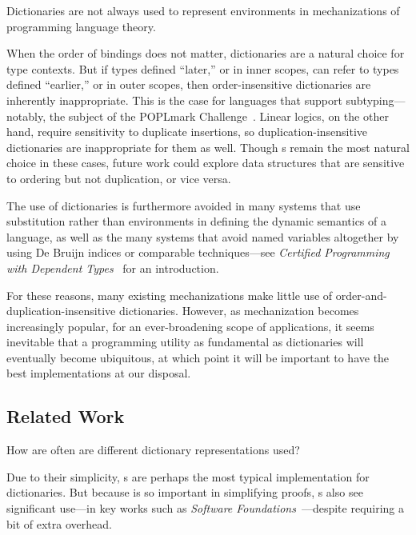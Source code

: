 
Dictionaries are not always used to represent environments in mechanizations of programming language theory.

When the order of bindings does not matter, dictionaries are a natural choice for type contexts.
%
But if types defined ``later,'' or in inner scopes, can refer to types defined ``earlier,'' or in outer scopes, then order-insensitive dictionaries are inherently inappropriate.
%
This is the case for languages that support subtyping---notably, the subject of the POPLmark Challenge~\citep{POPLmark}.
%
Linear logics, on the other hand, require sensitivity to duplicate insertions, so duplication-insensitive dictionaries are inappropriate for them as well.
%
Though {\sal}s remain the most natural choice in these cases, future work could explore data structures that are sensitive to ordering but not duplication, or vice versa.

The use of dictionaries is furthermore avoided in many systems that use substitution rather than environments
%
in defining the dynamic semantics of a language, as well as the many systems that avoid named variables altogether by using De Bruijn indices or comparable techniques---see \emph{Certified Programming with Dependent Types}~\cite[Library Firstorder]{cpdt} for an introduction.

For these reasons, many existing mechanizations make little use of order-and-duplication-insensitive dictionaries. 
%
However, as mechanization becomes increasingly popular, for an ever-broadening scope of applications,
%
it seems inevitable that a programming utility as fundamental as dictionaries will eventually become ubiquitous, at which point it will be important to have the
%
best implementations at our disposal.

\subsection{Related Work}

How are often are different dictionary representations used?

%
Due to their simplicity, {\sal}s are perhaps the most typical implementation for dictionaries.
%
But because \SemInj{} is so important in simplifying proofs, {\fpf}s also see significant use---in key works such as \emph{Software Foundations}~\cite[Maps]{Pierce:SF1}---despite requiring a bit of extra overhead.

